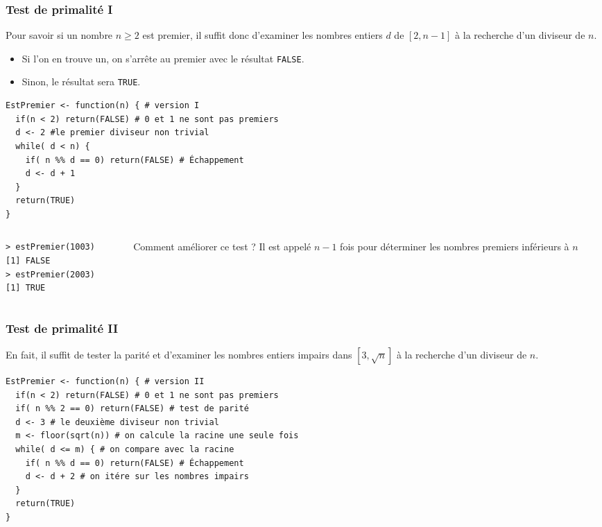 \documentclass[10pt]{beamer}
\begin{document}
\begin{frame}[fragile]
  \frametitle{Test de primalité I}
  Pour savoir si un nombre $n \geq 2$ est premier, il suffit donc d'examiner les nombres entiers $d$ de $[2,n-1]$ à la recherche d'un diviseur de $n$.
  \begin{itemize}
  \item Si l'on en trouve un, on s'arrête au premier avec le résultat \texttt{FALSE}.
  \item Sinon, le résultat sera \texttt{TRUE}.  
  \end{itemize}
  \begin{lstlisting}[style=editor]
EstPremier <- function(n) { # version I
  if(n < 2) return(FALSE) # 0 et 1 ne sont pas premiers
  d <- 2 #le premier diviseur non trivial
  while( d < n) {
    if( n %% d == 0) return(FALSE) # Échappement
    d <- d + 1
  }
  return(TRUE)
}    
\end{lstlisting}


\begin{columns}[t]
\begin{column}{0.4\textwidth}
  \begin{lstlisting}
> estPremier(1003)
[1] FALSE
> estPremier(2003)
[1] TRUE    
  \end{lstlisting}
\end{column}
\begin{column}{0.6\textwidth}

\begin{block}{Comment améliorer ce test ?}
  Il est appelé $n-1$ fois pour déterminer les nombres premiers inférieurs à $n$
\end{block}
\end{column}
\end{columns}

\end{frame}


\begin{frame}[fragile]
  \frametitle{Test de primalité II}
  En fait, il suffit \alert{de tester la parité et d'examiner les nombres entiers impairs dans $\left[3,\sqrt{n}\right]$} à la recherche d'un diviseur de $n$.
  
  \begin{lstlisting}[style=editor]
EstPremier <- function(n) { # version II
  if(n < 2) return(FALSE) # 0 et 1 ne sont pas premiers
  if( n %% 2 == 0) return(FALSE) # test de parité 
  d <- 3 # le deuxième diviseur non trivial
  m <- floor(sqrt(n)) # on calcule la racine une seule fois
  while( d <= m) { # on compare avec la racine
    if( n %% d == 0) return(FALSE) # Échappement
    d <- d + 2 # on itére sur les nombres impairs 
  }
  return(TRUE)
}    
\end{lstlisting}

\end{frame}
\end{document}
